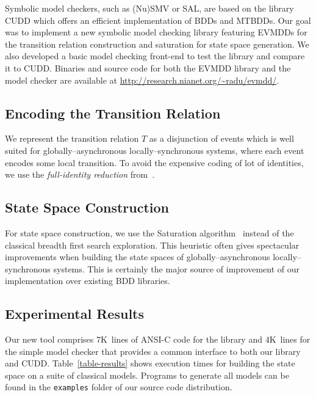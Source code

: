 \documentclass[a4paper]{easychair}
\begin{document}
Symbolic model checkers, such as (Nu)SMV or SAL,
are based on the library CUDD\cite{CUDD} which offers an efficient
implementation of BDDs and MTBDDs.
Our goal was to implement a new symbolic model checking library featuring
EVMDDs for the transition relation construction and saturation\cite{Saturation2001}
for state space generation. We also developed a basic
model checking front-end to test the library and compare it to CUDD.
Binaries and source code for both the EVMDD library and the model checker are available
at \url{http://research.nianet.org/~radu/evmdd/}.

\subsection{Encoding the Transition Relation}

We represent the transition relation $T$ as a disjunction of events
which is well suited for globally--asynchronous locally--synchronous systems,
where each event encodes some local transition.
To avoid the expensive coding of lot of identities,
we use the \emph{full-identity reduction} from~\cite{Ciardo2005}.

\subsection{State Space Construction}

For state space construction, we use the Saturation 
algorithm~\cite{Saturation2001} instead of the classical breadth first 
search exploration. This heuristic often gives spectacular improvements 
when building the state spaces of globally--asynchronous 
locally--synchronous systems. This is certainly the major source of 
improvement of our implementation over existing BDD libraries.


\subsection{Experimental Results}

Our new tool comprises 7K~lines of ANSI-C code for the library 
and 4K~lines for the simple model checker that provides a common 
interface to both our library and CUDD. Table~\ref{table-results} shows 
execution times for building the state space on a suite of classical models. 
Programs to generate all models can be found in the 
\texttt{examples} folder of our source code distribution.
\end{document}
